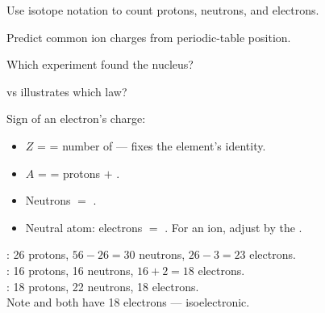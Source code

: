 \documentclass{apchem-notes}
\begin{document}

\begin{objectives}
  \item Use isotope notation to count protons, neutrons, and electrons.
  \item Predict common ion charges from periodic-table position.
\end{objectives}


\begin{warmup}[3]
  \item Which experiment found the nucleus? 
  \item {} vs  illustrates which law?
  \item Sign of an electron's charge: 
\end{warmup}



\begin{itemize}[leftmargin=*,itemsep=0.2em]
  \item $Z$ =  = number of
         --- fixes the element's identity.
  \item $A$ =  = protons $+$
        .
  \item Neutrons $= $ .
  \item Neutral atom: electrons $=$ .
        For an ion, adjust by the .
\end{itemize}

\begin{workedexample}
: 26 protons, $56-26 = 30$ neutrons,
$26-3 = 23$ electrons.\\
: 16 protons, 16 neutrons, $16+2 = 18$ electrons.\\
: 18 protons, 22 neutrons, 18 electrons.\\
Note  and  both have 18 electrons --- isoelectronic.
\end{workedexample}
\end{document}
